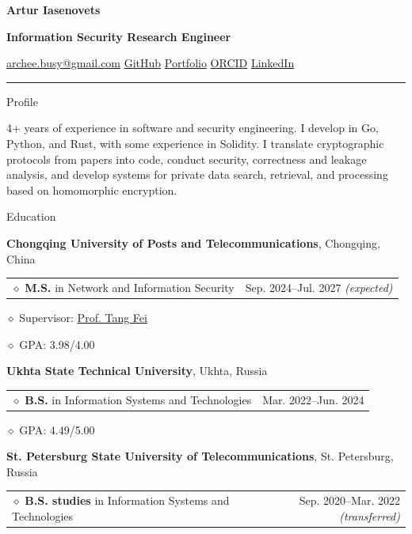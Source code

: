 \documentclass[11pt,a4paper]{article}
\makeatletter
\newcommand{\cvrow}[2]{%
  \noindent
  \begin{minipage}[t]{0.145\textwidth}
    \vspace{0pt}%
    \raggedright
    \fontsize{10.5}{12.5}\selectfont
    #1
  \end{minipage}%
  \hfill
  \begin{minipage}[t]{0.835\textwidth}
    \vspace{0pt}%
    #2
  \end{minipage}\par
}
\newcommand{\eduentry}[2]{%
  \noindent
  \begin{tabularx}{\linewidth}
    {@{}X@{\hspace{0.8em}}r@{}}
    #1 & \small #2
  \end{tabularx}\par
  \vspace{0.15em}
}
\newcommand{\edudetail}[1]{%
  \noindent\hspace*{1.15em}$\diamond$ #1\par
}
\makeatother
\begin{document}
{\fontsize{24}{28}\selectfont\bfseries Artur Iasenovets}\par
\vspace{0.08em}
{\large\bfseries Information Security Research Engineer}\par
\vspace{0.28em}
\href{mailto:archee.busy@gmail.com}{archee.busy@gmail.com}
\;\textbullet\;
\href{https://github.com/iasenovets}{GitHub}
\;\textbullet\;
\href{https://iasenovets.github.io/}{Portfolio}
\;\textbullet\;
\href{https://orcid.org/0009-0008-0008-3746}{ORCID}
\;\textbullet\;
\href{https://linkedin.com/in/iasenovets}{LinkedIn}
\par
\vspace{0.22em}
\hrule
\vspace{0.55em}

\cvrow{Profile}{%
  4+ years of experience in software and security engineering. I develop in Go,
  Python, and Rust, with some experience in Solidity.
  I translate cryptographic protocols from papers into code, conduct security,
  correctness and leakage analysis, and develop systems for private data search,
  retrieval, and processing based on homomorphic encryption.
}

\vspace{0.75em}

\cvrow{Education}{%
  \raggedright

  \textbf{Chongqing University of Posts and Telecommunications},
  Chongqing, China\par
  \vspace{0.12em}

  \eduentry
    {$\diamond$ \textbf{M.S.} in Network and Information Security}
    {Sep. 2024--Jul. 2027 \textit{(expected)}}

  \edudetail{Supervisor:
    \href{https://faculty.cqupt.edu.cn/tangfei/en/index.htm}{Prof. Tang Fei}}
  \edudetail{GPA: 3.98/4.00}

  \vspace{0.48em}

  \textbf{Ukhta State Technical University},
  Ukhta, Russia\par
  \vspace{0.12em}

  \eduentry
    {$\diamond$ \textbf{B.S.} in Information Systems and Technologies}
    {Mar. 2022--Jun. 2024}

  \edudetail{GPA: 4.49/5.00}

  \vspace{0.48em}

  \textbf{St. Petersburg State University of Telecommunications},
  St. Petersburg, Russia\par
  \vspace{0.12em}

  \eduentry
    {$\diamond$ \textbf{B.S. studies} in Information Systems and Technologies}
    {Sep. 2020--Mar. 2022 \textit{(transferred)}}
}
\end{document}
